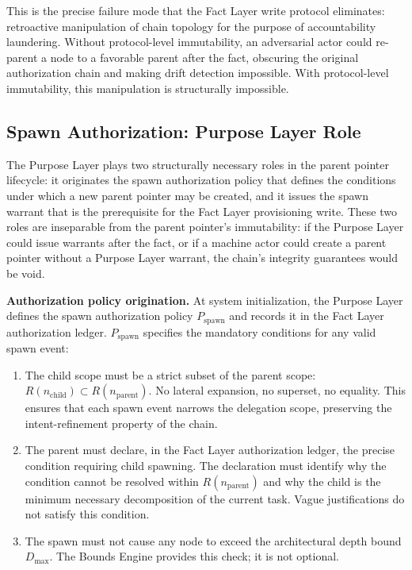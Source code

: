 This is the precise failure mode that the Fact Layer write protocol eliminates: retroactive manipulation of chain topology for the purpose of accountability laundering. Without protocol-level immutability, an adversarial actor could re-parent a node to a favorable parent after the fact, obscuring the original authorization chain and making drift detection impossible. With protocol-level immutability, this manipulation is structurally impossible.

\subsection{Spawn Authorization: Purpose Layer Role}
\label{sec:purpose-layer-spawn-authorization}

The Purpose Layer plays two structurally necessary roles in the parent pointer lifecycle: it originates the spawn authorization policy that defines the conditions under which a new parent pointer may be created, and it issues the spawn warrant that is the prerequisite for the Fact Layer provisioning write. These two roles are inseparable from the parent pointer's immutability: if the Purpose Layer could issue warrants after the fact, or if a machine actor could create a parent pointer without a Purpose Layer warrant, the chain's integrity guarantees would be void.

\medskip
\noindent\textbf{Authorization policy origination.} At system initialization, the Purpose Layer defines the spawn authorization policy $P_{\mathrm{spawn}}$ and records it in the Fact Layer authorization ledger. $P_{\mathrm{spawn}}$ specifies the mandatory conditions for any valid spawn event:

\begin{enumerate}
    \item[(S1) \textbf{Scope refinement.}] The child scope must be a strict subset of the parent scope: $R(n_{\mathrm{child}}) \subset R(n_{\mathrm{parent}})$. No lateral expansion, no superset, no equality. This ensures that each spawn event narrows the delegation scope, preserving the intent-refinement property of the chain.

    \item[(S2) \textbf{Operational necessity.}] The parent must declare, in the Fact Layer authorization ledger, the precise condition requiring child spawning. The declaration must identify why the condition cannot be resolved within $R(n_{\mathrm{parent}})$ and why the child is the minimum necessary decomposition of the current task. Vague justifications do not satisfy this condition.

    \item[(S3) \textbf{Depth bound compliance.}] The spawn must not cause any node to exceed the architectural depth bound $D_{\mathrm{max}}$. The Bounds Engine provides this check; it is not optional.
\end{enumerate}

